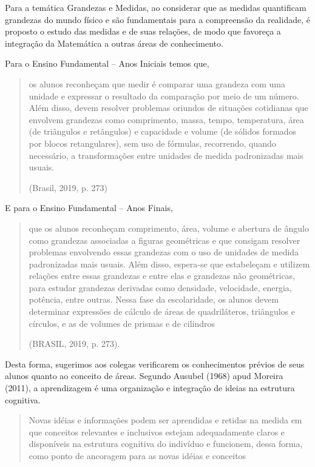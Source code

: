 \begin{apresentacao}
Para a temática Grandezas e Medidas, ao considerar que as medidas quantificam grandezas do mundo físico e são fundamentais para a compreensão da realidade, é proposto o estudo das medidas e de suas relações, de modo que favoreça a integração da Matemática a outras áreas de conhecimento.

Para o Ensino Fundamental -- Anos Iniciais temos que,
  \begin{quote}
  os alunos reconheçam que medir é comparar uma grandeza com uma unidade e expressar o resultado da comparação por meio de um número. Além disso, devem resolver problemas oriundos de situações cotidianas que envolvem grandezas como comprimento, massa, tempo, temperatura, área (de triângulos e retângulos) e capacidade e volume (de sólidos formados por blocos retangulares), sem uso de fórmulas, recorrendo, quando necessário, a transformações entre unidades de medida padronizadas mais usuais.
  \flushright
  
  (Brasil, 2019, p. 273)
  \end{quote}

E para o Ensino Fundamental --  Anos Finais,
  \begin{quote}
  que os alunos reconheçam comprimento, área, volume e abertura de ângulo como grandezas associadas a figuras geométricas e que consigam resolver problemas envolvendo essas grandezas com o uso de unidades de medida padronizadas mais usuais. Além disso, espera-se que estabeleçam e utilizem relações entre essas grandezas e entre elas e grandezas não geométricas, para estudar grandezas derivadas como densidade, velocidade, energia, potência, entre outras. Nessa fase da escolaridade, os alunos devem determinar expressões de cálculo de áreas de quadriláteros, triângulos e círculos, e as de volumes de prismas e de cilindros 
  \flushright

  (BRASIL, 2019, p. 273).
  \end{quote}

  Desta forma, sugerimos aos colegas verificarem os conhecimentos prévios de seus alunos quanto ao conceito de áreas. Segundo Ausubel (1968) apud Moreira (2011), a aprendizagem é uma organização e integração de ideias na estrutura cognitiva.
  \begin{quote}
  Novas idéias e informações podem ser aprendidas e retidas na medida em que conceitos relevantes e inclusivos estejam adequadamente claros e disponíveis na estrutura cognitiva do indivíduo e funcionem, dessa forma, como ponto de ancoragem para as novas idéias e conceitos 


\end{quote}
\end{apresentacao}
